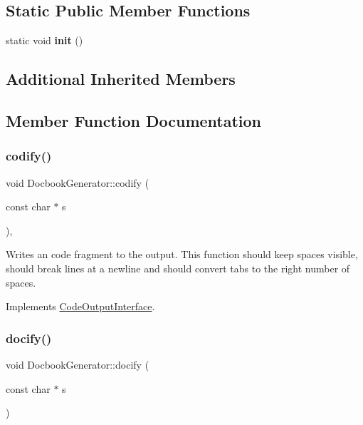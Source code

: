 \subsection*{Static Public Member Functions}
\begin{DoxyCompactItemize}
\item 
\mbox{\label{class_docbook_generator_af4363bcfe3875a66c7f2512feb6be13e}} 
static void {\bfseries init} ()
\end{DoxyCompactItemize}
\subsection*{Additional Inherited Members}


\subsection{Member Function Documentation}
\mbox{\label{class_docbook_generator_a9e4ccf3b4bf296deabf156225e2d02a1}} 
\subsubsection{\texorpdfstring{codify()}{codify()}}
{\footnotesize\ttfamily void Docbook\+Generator\+::codify (\begin{DoxyParamCaption}\item[{const char $\ast$}]{s }\end{DoxyParamCaption})\hspace{0.3cm}{\ttfamily [inline]}, {\ttfamily [virtual]}}

Writes an code fragment to the output. This function should keep spaces visible, should break lines at a newline and should convert tabs to the right number of spaces. 

Implements \mbox{\hyperlink{class_code_output_interface_aa29a5eedda08596ace50ed5b59c8ae7f}{Code\+Output\+Interface}}.

\mbox{\label{class_docbook_generator_a78cc7c7199538d0f38d2696443ca71bf}} 
\subsubsection{\texorpdfstring{docify()}{docify()}}
{\footnotesize\ttfamily void Docbook\+Generator\+::docify (\begin{DoxyParamCaption}\item[{const char $\ast$}]{s }\end{DoxyParamCaption})\hspace{0.3cm}{\ttfamily [virtual]}}

